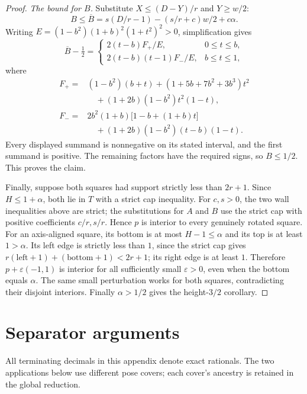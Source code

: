 \documentclass[11pt]{article}
\begin{document}
\begin{proof}
\emph{The bound for $B$.}
Substitute $X\le(D-Y)/r$ and $Y\ge w/2$:
\[
 B\le\overline B=s(D/r-1)-(s/r+c)w/2+c\alpha.
\]
Writing $E=(1-b^2)(1+b)^2(1+t^2)^2>0$, simplification gives
\[
 \overline B-\tfrac12=
 \begin{cases}
   2(t-b)F_+/E,&0\le t\le b,\\
   2(t-b)(t-1)F_-/E,&b\le t\le1,
 \end{cases}
\]
where
\begin{align*}
 F_+={}&(1-b^2)(b+t)
 +(1+5b+7b^2+3b^3)t^2\\
 &\quad +(1+2b)(1-b^2)t^2(1-t),\\
 F_-={}&2b^2(1+b)\bigl[1-b+(1+b)t\bigr]\\
 &\quad +(1+2b)(1-b^2)(t-b)(1-t).
\end{align*}
Every displayed summand is nonnegative on its stated interval, and the
first summand is positive. The remaining factors have the required
signs, so $B\le1/2$. This proves the claim.

Finally, suppose both squares had support strictly less than $2r+1$.
Since $H\le1+\alpha$, both lie in $T$ with a strict cap inequality.
For $c,s>0$, the two wall inequalities above are strict; the substitutions
for $A$ and $B$ use the strict cap with positive coefficients $c/r,s/r$.
Hence $p$ is interior to every genuinely rotated square. For an
axis-aligned square, its bottom is at most $H-1\le\alpha$ and its top
is at least $1>\alpha$. Its left edge is strictly less than $1$, since
the strict cap gives
$r(\mathrm{left}+1)+(\mathrm{bottom}+1)<2r+1$;
its right edge is at least $1$. Therefore
$p+\varepsilon(-1,1)$ is interior for all sufficiently small
$\varepsilon>0$, even when the bottom equals $\alpha$.
The same small perturbation works for both squares, contradicting their
disjoint interiors. Finally $\alpha>1/2$ gives the height-$3/2$ corollary.
\end{proof}

\section{Separator arguments}\label{app:compact-separators}
All terminating decimals in this appendix denote exact rationals.
The two applications below use different pose covers; each cover's
ancestry is retained in the global reduction.
\end{document}
